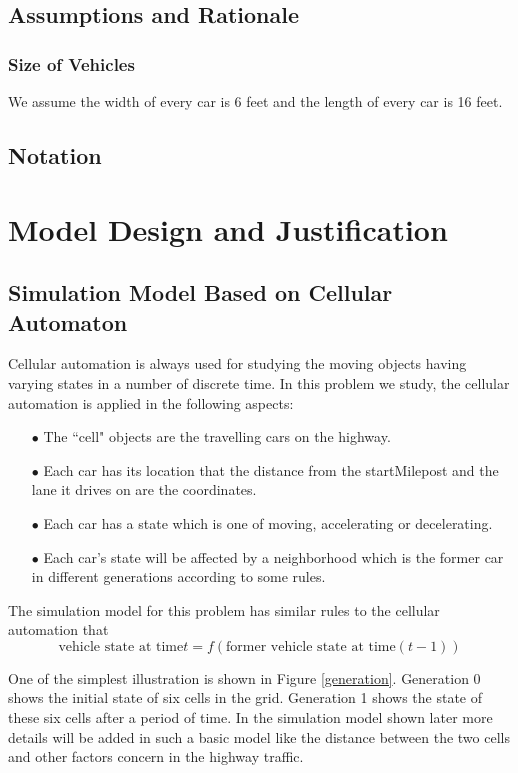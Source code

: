 \documentclass[a4paper]{article}
\begin{document}
	\subsection{Assumptions and Rationale}
	\subsubsection{Size of Vehicles}
	We assume the width of every car is 6 feet and the length of every car is 16 feet.

	\subsection{Notation}

	\section{Model Design and Justification}
	\subsection{Simulation Model Based on Cellular Automaton}
	Cellular automation is always used for studying the moving objects having varying states in a number of discrete time. In this problem we study, the cellular automation is applied in the following aspects:
	\begin{enumerate}
		\item[$ \bullet $] The ``cell" objects are the travelling cars on the highway.
		\item[$ \bullet $] Each car has its location that the distance from the startMilepost and the lane it drives on are the coordinates.
		\item[$ \bullet $] Each car has a state which is one of moving, accelerating or decelerating.
		\item[$ \bullet $] Each car's state will be affected by a neighborhood which is the former car in different generations according to some rules.
	\end{enumerate}

	The simulation model for this problem has similar rules to the cellular automation that
	$$ \text{vehicle state at time} t=f(\text{former vehicle state at time} (t-1)) $$

	One of the simplest illustration is shown in Figure \ref{generation}. Generation 0 shows the initial state of six cells in the grid. Generation 1 shows the state of these six cells after a period of time. In the simulation model shown later more details will be added in such a basic model like the distance between the two cells and other factors concern in the highway traffic.
\end{document}
